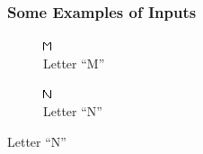 \documentclass[a4paper,12pt]{report}
\begin{document}
\begin{figure}
\subsubsection*{Some Examples of Inputs}
        \centering
        \begin{subfigure}[h!]{0.3\textwidth}
                \includegraphics[width=\textwidth]{M.png}
                \caption{Letter ``M''}
                
        \end{subfigure}
        \quad \quad \quad \quad \quad \quad
        \begin{subfigure}[h!]{0.3\textwidth}
                \includegraphics[width=\textwidth]{N.png}
                \caption{Letter ``N''}
                

\end{subfigure}
\end{figure}
\end{document}
